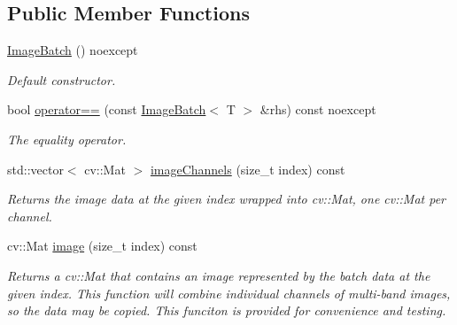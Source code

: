 \subsection*{Public Member Functions}
\begin{DoxyCompactItemize}
\item 
\hyperlink{group___imagery_module_ga52149325af21fd8be3bde4c7d78696cd}{Image\+Batch} () noexcept
\begin{DoxyCompactList}\small\item\em Default constructor. \end{DoxyCompactList}\item 
bool \hyperlink{group___imagery_module_ga6663c2526c7d20915f501b0ac54117be}{operator==} (const \hyperlink{structdg_1_1deepcore_1_1imagery_1_1_image_batch}{Image\+Batch}$<$ T $>$ \&rhs) const noexcept
\begin{DoxyCompactList}\small\item\em The equality operator. \end{DoxyCompactList}\item 
std\+::vector$<$ cv\+::\+Mat $>$ \hyperlink{group___imagery_module_ga7ccd99a9f9c630c7b732712635684f1f}{image\+Channels} (size\+\_\+t index) const 
\begin{DoxyCompactList}\small\item\em Returns the image data at the given index wrapped into cv\+::\+Mat, one cv\+::\+Mat per channel. \end{DoxyCompactList}\item 
cv\+::\+Mat \hyperlink{group___imagery_module_ga73b4b21231657bbb95ab18e4be9f4e19}{image} (size\+\_\+t index) const 
\begin{DoxyCompactList}\small\item\em Returns a cv\+::\+Mat that contains an image represented by the batch data at the given index. This function will combine individual channels of multi-\/band images, so the data may be copied. This funciton is provided for convenience and testing. \end{DoxyCompactList}\end{DoxyCompactItemize}
